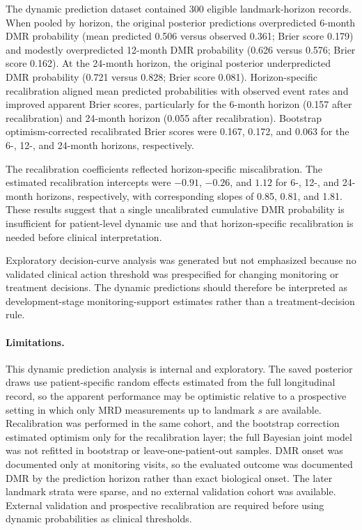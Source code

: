 The dynamic prediction dataset contained 300 eligible landmark-horizon records. When pooled by horizon, the original posterior predictions overpredicted 6-month DMR probability (mean predicted 0.506 versus observed 0.361; Brier score 0.179) and modestly overpredicted 12-month DMR probability (0.626 versus 0.576; Brier score 0.162). At the 24-month horizon, the original posterior underpredicted DMR probability (0.721 versus 0.828; Brier score 0.081). Horizon-specific recalibration aligned mean predicted probabilities with observed event rates and improved apparent Brier scores, particularly for the 6-month horizon (0.157 after recalibration) and 24-month horizon (0.055 after recalibration). Bootstrap optimism-corrected recalibrated Brier scores were 0.167, 0.172, and 0.063 for the 6-, 12-, and 24-month horizons, respectively.

The recalibration coefficients reflected horizon-specific miscalibration. The estimated recalibration intercepts were \(-0.91\), \(-0.26\), and \(1.12\) for 6-, 12-, and 24-month horizons, respectively, with corresponding slopes of 0.85, 0.81, and 1.81. These results suggest that a single uncalibrated cumulative DMR probability is insufficient for patient-level dynamic use and that horizon-specific recalibration is needed before clinical interpretation.

Exploratory decision-curve analysis was generated but not emphasized because no validated clinical action threshold was prespecified for changing monitoring or treatment decisions. The dynamic predictions should therefore be interpreted as development-stage monitoring-support estimates rather than a treatment-decision rule.

\paragraph{Limitations.}
This dynamic prediction analysis is internal and exploratory. The saved posterior draws use patient-specific random effects estimated from the full longitudinal record, so the apparent performance may be optimistic relative to a prospective setting in which only MRD measurements up to landmark \(s\) are available. Recalibration was performed in the same cohort, and the bootstrap correction estimated optimism only for the recalibration layer; the full Bayesian joint model was not refitted in bootstrap or leave-one-patient-out samples. DMR onset was documented only at monitoring visits, so the evaluated outcome was documented DMR by the prediction horizon rather than exact biological onset. The later landmark strata were sparse, and no external validation cohort was available. External validation and prospective recalibration are required before using dynamic probabilities as clinical thresholds.
